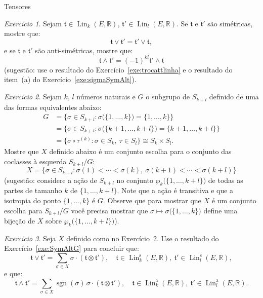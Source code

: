 \documentclass[oneside,11pt]{amsart}
\newcommand{\R}{\mathds R}
\DeclareMathOperator{\Lin}{Lin}
\DeclareMathOperator{\sgn}{sgn}
\theoremstyle{remark}\newtheorem{exercise}{Exercício}[section]
\theoremstyle{plain}\newtheorem{teo}{Teorema}[section]
\theoremstyle{plain}\newtheorem{lem}[teo]{Lema}
\theoremstyle{plain}\newtheorem{prop}[teo]{Proposição}
\theoremstyle{definition}\newtheorem{defin}[teo]{Definição}
\theoremstyle{remark}\newtheorem{rem}[teo]{Observação}
\theoremstyle{definition}\newtheorem{example}[teo]{Exemplo}
\numberwithin{equation}{section}
\begin{document}
\begin{section}{Tensores}
\begin{exercise}
Sejam $\mathfrak t\in\Lin_k(E,\R)$, $\mathfrak t'\in\Lin_l(E,\R)$. Se $\mathfrak t$ e $\mathfrak t'$ são simétricas, mostre que:
\[\mathfrak t\vee\mathfrak t'=\mathfrak t'\vee\mathfrak t,\]
e se $\mathfrak t$ e $\mathfrak t'$ são anti-simétricas, mostre que:
\[\mathfrak t\wedge\mathfrak t'=(-1)^{kl}\mathfrak t'\wedge\mathfrak t\]
(sugestão: use o resultado do Exercício~\ref{exe:trocattlinha} e o resultado do item~(a) do Exercício~\ref{exe:sigmaSymAlt}).
\end{exercise}

\begin{exercise}\label{exe:XSkSl}
Sejam $k$, $l$ números naturais e $G$ o subgrupo de $S_{k+l}$ definido de uma das formas equivalentes abaixo:
\begin{align*}
G&=\big\{\sigma\in S_{k+l}:\sigma\big(\{1,\ldots,k\}\big)=\{1,\ldots,k\}\big\}\\
&=\big\{\sigma\in S_{k+l}:\sigma\big(\{k+1,\ldots,k+l\}\big)=\{k+1,\ldots,k+l\}\big\}\\
&=\big\{\sigma\circ\tau^{(k)}:\sigma\in S_k,\ \tau\in S_l\big\}\cong S_k\times S_l.
\end{align*}
Mostre que $X$ definido abaixo é um conjunto escolha para o conjunto das coclasses à esquerda $S_{k+l}/G$:
\[X=\big\{\sigma\in S_{k+l}:\sigma(1)<\cdots<\sigma(k),\ \sigma(k+1)<\cdots<\sigma(k+l)\big\}\]
(sugestão: considere a ação de $S_{k+l}$ no conjunto $\wp_k\big(\{1,\ldots,k+l\}\big)$ de todas as partes de tamanho $k$ de $\{1,\ldots,k+l\}$.
Note que a ação é transitiva e que a isotropia do ponto $\{1,\ldots,k\}$ é $G$. Observe que para mostrar que $X$ é um conjunto escolha para $S_{k+l}/G$
você precisa mostrar que $\sigma\mapsto\sigma\big(\{1,\ldots,k\}\big)$ define uma bijeção de $X$ sobre $\wp_k\big(\{1,\ldots,k+l\}\big)$).
\end{exercise}

\begin{exercise}\label{exe:veewedgeeconomico}
Seja $X$ definido como no Exercício~\ref{exe:XSkSl}.
Use o resultado do Exercício~\ref{exe:SymAltG} para concluir que:
\[\mathfrak t\vee\mathfrak t'=\sum_{\sigma\in X}\sigma\cdot(\mathfrak t\otimes\mathfrak t'),\quad
\mathfrak t\in\Lin_k^{\mathrm s}(E,\R),\ \mathfrak t'\in\Lin_l^{\mathrm s}(E,\R),\]
e que:
\[\mathfrak t\wedge\mathfrak t'=\sum_{\sigma\in X}\sgn(\sigma)\,\sigma\cdot(\mathfrak t\otimes\mathfrak t'),\quad
\mathfrak t\in\Lin_k^{\mathrm a}(E,\R),\ \mathfrak t'\in\Lin_l^{\mathrm a}(E,\R).\]
\end{exercise}


\end{section}
\end{document}
